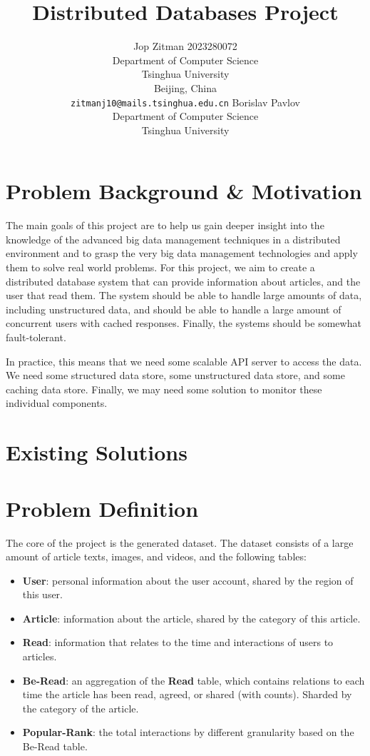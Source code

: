 \documentclass{article}
\title{Distributed Databases Project}
\author{
    Jop Zitman 2023280072\\
    Department of Computer Science\\
    Tsinghua University\\
    Beijing, China \\
    \texttt{zitmanj10@mails.tsinghua.edu.cn}
    \And
    Borislav Pavlov\\
    Department of Computer Science\\
    Tsinghua University\\
    \texttt{}
}
\begin{document}
    \maketitle

    \abstract


    \section{Problem Background \& Motivation}
    The main goals of this project are to help us gain deeper insight into the knowledge of the advanced big data management techniques in a distributed environment and to grasp the very big data management technologies and apply them to solve real world problems.
    For this project, we aim to create a distributed database system that can provide information about articles, and the user that read them.
    The system should be able to handle large amounts of data, including unstructured data, and should be able to handle a large amount of concurrent users with cached responses.
    Finally, the systems should be somewhat fault-tolerant.

    In practice, this means that we need some scalable API server to access the data.
    We need some structured data store, some unstructured data store, and some caching data store.
    Finally, we may need some solution to monitor these individual components.


    \section{Existing Solutions}


    \section{Problem Definition}
    The core of the project is the generated dataset.
    The dataset consists of a large amount of article texts, images, and videos, and the following tables:

    \begin{itemize}
        \item \textbf{User}: personal information about the user account, shared by the region of this user.
        \item \textbf{Article}: information about the article, shared by the category of this article.
        \item \textbf{Read}: information that relates to the time and interactions of users to articles.
        \item \textbf{Be-Read}: an aggregation of the \textbf{Read} table, which contains relations to each time the article has been read, agreed, or shared (with counts). Sharded by the category of the article.
        \item \textbf{Popular-Rank}: the total interactions by different granularity based on the Be-Read table.
    \end{itemize}
\end{document}
